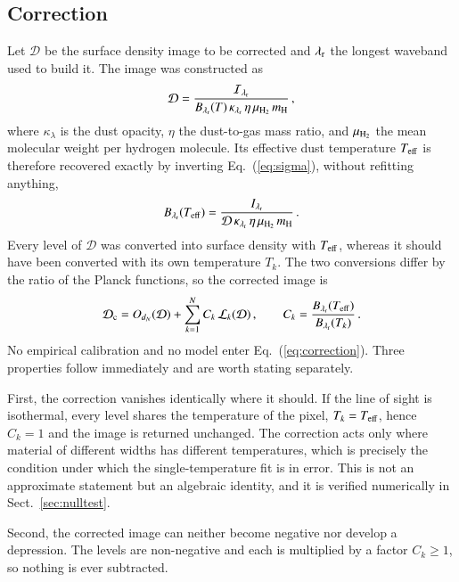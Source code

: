 \documentclass{aa}
\newcommand{\mH}{m_{\rm H}}
\newcommand{\muH}{\mu_{\rm H_2}}
\newcommand{\Teff}{T_{\rm eff}}
\newcommand{\Sc}{\mathcal{D}_{\rm c}}
\newcommand{\Sim}{\mathcal{D}}
\newcommand{\Iim}{\mathcal{I}}
\begin{document}
\subsection{Correction}
\label{sec:correction}

Let $\Sim$ be the surface density image to be corrected and $\lambda_{\rm r}$
the longest waveband used to build it. The image was constructed as
%
\begin{equation}
   \Sim = \frac{\Iim_{\lambda_{\rm r}}}
                 {B_{\lambda_{\rm r}}(T)\,\kappa_{\lambda_{\rm r}}\,
                  \eta\,\muH\,\mH} \,,
   \label{eq:sigma}
\end{equation}
%
where $\kappa_\lambda$ is the dust opacity, $\eta$ the dust-to-gas mass ratio,
and $\muH$ the mean molecular weight per hydrogen molecule. Its effective dust
temperature $\Teff$ is therefore recovered exactly by inverting
Eq.~(\ref{eq:sigma}), without refitting anything,
%
\begin{equation}
   B_{\lambda_{\rm r}}(\Teff) =
   \frac{I_{\lambda_{\rm r}}}
        {\Sim\,\kappa_{\lambda_{\rm r}}\,\eta\,\muH\,\mH} \,.
   \label{eq:teff}
\end{equation}
%
Every level of $\Sim$ was converted into surface density with $\Teff$,
whereas it should have been converted with its own temperature $T_k$. The two
conversions differ by the ratio of the Planck functions, so the corrected image
is
%
\begin{equation}
   \Sc = O_{d_N}(\Sim) + \sum_{k=1}^{N} C_k\, \mathcal{L}_k(\Sim) \,,
   \qquad
   C_k = \frac{B_{\lambda_{\rm r}}(\Teff)}{B_{\lambda_{\rm r}}(T_k)} \,.
   \label{eq:correction}
\end{equation}
%
No empirical calibration and no model enter Eq.~(\ref{eq:correction}). Three
properties follow immediately and are worth stating separately.

First, the correction vanishes identically where it should. If the line of
sight is isothermal, every level shares the temperature of the pixel, $T_k =
\Teff$, hence $C_k = 1$ and the image is returned unchanged. The correction
acts only where material of different widths has different temperatures, which
is precisely the condition under which the single-temperature fit is in error.
This is not an approximate statement but an algebraic identity, and it is
verified numerically in Sect.~\ref{sec:nulltest}.

Second, the corrected image can neither become negative nor develop a
depression. The levels are non-negative and each is multiplied by a factor
$C_k \ge 1$, so nothing is ever subtracted.
\end{document}
